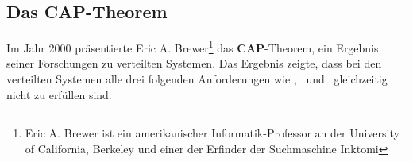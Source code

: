 \subsection{Das CAP-Theorem}\label{cap}
Im Jahr 2000 präsentierte Eric A. Brewer\footnote{Eric A. Brewer ist ein amerikanischer Informatik-Professor an der University of California, Berkeley und einer der Erfinder der Suchmaschine Inktomi} das \textbf{CAP}-Theorem, ein Ergebnis seiner Forschungen zu verteilten Systemen. Das Ergebnis zeigte, dass bei den verteilten Systemen alle drei folgenden Anforderungen wie \Cap, \cAp\ und \caP\ gleichzeitig nicht zu erfüllen sind.


